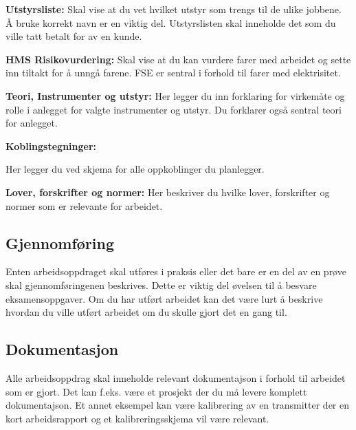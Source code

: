\vskip 10pt 
\textbf{Utstyrsliste:}
\vskip 10pt 
Skal vise at du vet hvilket utstyr som trengs til de ulike jobbene. Å bruke korrekt navn er en viktig del. Utstyrslisten skal inneholde det som du ville tatt betalt for av en kunde. 

\vskip 10pt 
\textbf{HMS Risikovurdering:}
\vskip 10pt 
Skal vise at du kan vurdere farer med arbeidet og sette inn tiltakt for å unngå farene. FSE er sentral i forhold til farer med elektrisitet. 

\vskip 5pt 
\vskip 10pt 
\textbf{Teori, Instrumenter og utstyr:}
\vskip 10pt 
\vskip 5pt 
Her legger du inn forklaring for virkemåte og rolle i anlegget for valgte instrumenter og utstyr. Du forklarer også sentral teori for anlegget.

\vskip 5pt 
\textbf{Koblingstegninger:}

Her legger du ved skjema for alle oppkoblinger du planlegger. 

\vskip 10pt 
\vskip 10pt 
\textbf{Lover, forskrifter og normer:}
\vskip 10pt 
Her beskriver du hvilke lover, forskrifter og normer som er relevante for arbeidet. 
\subsection{Gjennomføring}

Enten arbeidsoppdraget skal utføres i praksis eller det bare er en del av en prøve skal gjennomføringenen beskrives. Dette er viktig del øvelsen til å besvare eksamensoppgaver. 
\vskip 5pt 
Om du har utført arbeidet kan det være lurt å beskrive hvordan du ville utført arbeidet om du skulle gjort det en gang til. 
\subsection{Dokumentasjon}

\vskip 5pt 
Alle arbeidsoppdrag skal inneholde relevant dokumentajson i forhold til arbeidet som er gjort. Det kan f.eks. være et prosjekt der du må levere komplett dokumentajson. Et annet eksempel kan være kalibrering av en transmitter der en kort arbeidsrapport og et kalibreringsskjema vil være relevant. 

